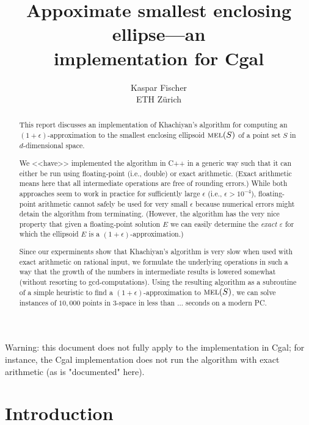 \documentclass[a4paper,twocolumn]{article}
\newcommand{\MEL}{\ensuremath{\mathop{\textnormal{\textsc{mel}}}\nolimits}}
\begin{document}
\title{Appoximate smallest enclosing ellipse---an \\
implementation for {\sc Cgal}}
\author{Kaspar Fischer \\ ETH Z\"urich}
\maketitle

\begin{center}
  \begin{sc}
    Warning: this document does not fully apply to the implementation
    in Cgal; for instance, the Cgal implementation does not run the
    algorithm with exact arithmetic (as is "documented" here).
  \end{sc}
\end{center}

\begin{abstract}
  This report discusses an implementation of Khachiyan's algorithm
  \cite{k-rprnmc-96} for computing an $(1+\epsilon)$-approximation to
  the smallest enclosing ellipsoid $\MEL(S)$ of a point set $S$ in
  $d$-dimensional space.

  We <<have>> implemented the algorithm in C++ in a generic way such that
  it can either be run using floating-point (i.e., double) or exact
  arithmetic.  (Exact arithmetic means here that all intermediate
  operations are free of rounding errors.)  While both approaches seem
  to work in practice for sufficiently large $\epsilon$ (i.e.,
  $\epsilon>10^{-4}$), floating-point arithmetic cannot safely be used
  for very small $\epsilon$ because numerical errors might detain the
  algorithm from terminating.  (However, the algorithm has the very
  nice property that given a floating-point solution $E$ we can easily
  determine the \emph{exact} $\varepsilon$ for which the ellipsoid $E$ is a
  $(1+\epsilon)$-approximation.)

  Since our experminents show that Khachiyan's algorithm is very slow
  when used with exact arithmetic on rational input, we formulate the
  underlying operations in such a way that the growth of the numbers
  in intermediate results is lowered somewhat (without resorting to
  gcd-computations).  Using the resulting algorithm as a subroutine of
  a simple heuristic to find a $(1+\epsilon)$-approximation to
  $\MEL(S)$, we can solve instances of $10,\!000$ points in 3-space in
  less than ... seconds on a modern PC.
\end{abstract}

\section{Introduction}
\end{document}
